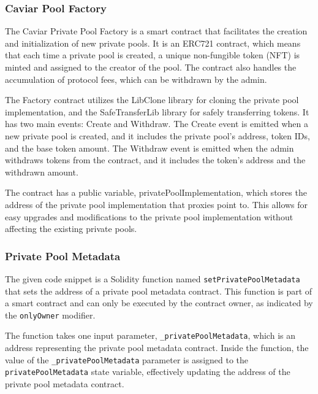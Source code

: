 \hypertarget{caviar-pool-factory}{%
\subsubsection{Caviar Pool Factory}\label{caviar-pool-factory}}

The Caviar Private Pool Factory is a smart contract that facilitates the
creation and initialization of new private pools. It is an ERC721
contract, which means that each time a private pool is created, a unique
non-fungible token (NFT) is minted and assigned to the creator of the
pool. The contract also handles the accumulation of protocol fees, which
can be withdrawn by the admin.

The Factory contract utilizes the LibClone library for cloning the
private pool implementation, and the SafeTransferLib library for safely
transferring tokens. It has two main events: Create and Withdraw. The
Create event is emitted when a new private pool is created, and it
includes the private pool's address, token IDs, and the base token
amount. The Withdraw event is emitted when the admin withdraws tokens
from the contract, and it includes the token's address and the withdrawn
amount.

The contract has a public variable, privatePoolImplementation, which
stores the address of the private pool implementation that proxies point
to. This allows for easy upgrades and modifications to the private pool
implementation without affecting the existing private pools.

\hypertarget{private-pool-metadata}{%
\subsubsection{Private Pool Metadata}\label{private-pool-metadata}}

The given code snippet is a Solidity function named
\texttt{setPrivatePoolMetadata} that sets the address of a private pool
metadata contract. This function is part of a smart contract and can
only be executed by the contract owner, as indicated by the
\texttt{onlyOwner} modifier.

The function takes one input parameter, \texttt{\_privatePoolMetadata},
which is an address representing the private pool metadata contract.
Inside the function, the value of the \texttt{\_privatePoolMetadata}
parameter is assigned to the \texttt{privatePoolMetadata} state
variable, effectively updating the address of the private pool metadata
contract.

